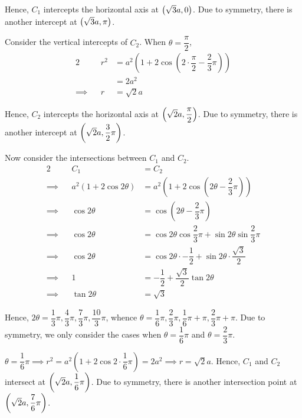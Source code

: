 \documentclass{echw}
\begin{document}
            Hence, $C_1$ intercepts the horizontal axis at $\left(\sqrt3a, 0\right)$. Due to symmetry, there is another intercept at $\left(\sqrt3a, \pi\right)$.

            Consider the vertical intercepts of $C_2$. When $\theta = \dfrac\pi2$,
            \begin{alignat*}{2}
                &&r^2 &= a^2 \left(1 + 2\cos \left(2\cdot\dfrac\pi2 - \dfrac23 \pi \right)\right)\\
                && &= 2a^2\\
                \implies&&r &= \sqrt2a
            \end{alignat*}

            Hence, $C_2$ intercepts the horizontal axis at $\left(\sqrt2a, \dfrac\pi2\right)$. Due to symmetry, there is another intercept at $\left(\sqrt2a, \dfrac32 \pi\right)$.

            Now consider the intersections between $C_1$ and $C_2$.
            \begin{alignat*}{2}
                &&C_1 &= C_2\\
                \implies&&a^2\left(1 + 2\cos2\theta\right) &= a^2 \left(1 + 2\cos \left(2\theta - \dfrac23 \pi \right)\right)\\
                \implies&&\cos2\theta &= \cos \left(2\theta - \dfrac23 \pi \right)\\
                \implies&&\cos2\theta &= \cos2\theta\cos\dfrac23\pi + \sin2\theta\sin\dfrac23\pi\\
                \implies&&\cos2\theta &= \cos2\theta\cdot-\dfrac12 + \sin2\theta\cdot\dfrac{\sqrt3}2\\
                \implies&&1 &= -\dfrac12 + \dfrac{\sqrt3}2\tan2\theta\\
                \implies&&\tan2\theta &= \sqrt3
            \end{alignat*}

            Hence, $2\theta = \dfrac13\pi, \dfrac43\pi, \dfrac73\pi,\dfrac{10}3\pi$, whence $\theta = \dfrac16\pi, \dfrac23\pi, \dfrac16\pi + \pi, \dfrac23\pi + \pi$. Due to symmetry, we only consider the cases when $\theta = \dfrac16\pi$ and $\theta = \dfrac23\pi$.

             $\theta = \dfrac16\pi \implies r^2 = a^2 \left(1 + 2\cos 2\cdot\dfrac16\pi\right) = 2a^2 \implies r = \sqrt2a$. Hence, $C_1$ and $C_2$ intersect at $\left(\sqrt2a, \dfrac16 \pi\right)$. Due to symmetry, there is another intersection point at $\left(\sqrt2a, \dfrac76 \pi\right)$.
\end{document}
